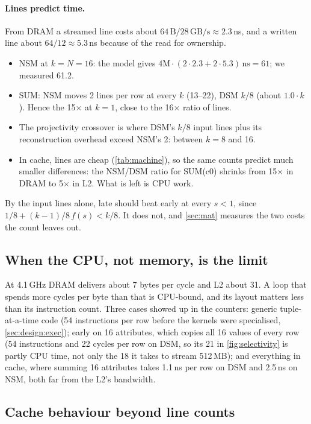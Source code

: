 \paragraph{Lines predict time.} From DRAM a streamed line costs about $64\,\text{B} /
28\,\text{GB/s} \approx 2.3$\,ns, and a written line about $64/12 \approx 5.3$\,ns because of the
read for ownership.
\begin{itemize}
\item NSM  at $k{=}N{=}16$: the model gives $4\mathrm{M} \cdot (2 \cdot 2.3 + 2
\cdot 5.3)\,\text{ns} = 61$\ms; we measured 61.2\ms.
\item SUM: NSM moves 2 lines per row at every $k$ (13--22\ms), DSM $k/8$ (about $1.0 \cdot
k$\ms). Hence the 15$\times$ at $k{=}1$, close to the 16$\times$ ratio of lines.
\item The projectivity crossover is where DSM's $k/8$ input lines plus its reconstruction
overhead exceed NSM's 2: between $k{=}8$ and 16.
\item In cache, lines are cheap (\cref{tab:machine}), so the same counts predict much smaller
differences: the NSM/DSM ratio for SUM(c0) shrinks from 15$\times$ in DRAM to 5$\times$ in L2.
What is left is CPU work.
\end{itemize}
By the input lines alone, late should beat early at every $s < 1$, since
$1/8 + (k-1)/8\,f(s) < k/8$. It does not, and \cref{sec:mat} measures the two costs the count
leaves out.

\subsection{When the CPU, not memory, is the limit}
\label{sec:analysis:cpu}

At 4.1\,GHz DRAM delivers about 7 bytes per cycle and L2 about 31. A loop that spends more
cycles per byte than that is CPU-bound, and its layout matters less than its instruction
count. Three cases showed up in the counters: generic tuple-at-a-time code (54 instructions
per row before the kernels were specialised, \cref{sec:design:exec}); early on 16 attributes,
which copies all 16 values of every row (54 instructions and 22 cycles per row on DSM, so its
21\ms{} in \cref{fig:selectivity} is partly CPU time, not only the 18\ms{} it takes to stream
512\,MB); and everything in cache, where summing 16 attributes takes 1.1\,ns per row on DSM
and 2.5\,ns on NSM, both far from the L2's bandwidth.

\subsection{Cache behaviour beyond line counts}
\label{sec:analysis:cache}

